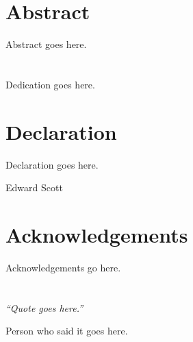 \chapter*{\centering Abstract}
Abstract goes here.


\chapter*{\centering }%
\begin{center}
    \thispagestyle{empty}
    Dedication goes here.
\end{center}


\chapter*{\centering Declaration}
Declaration goes here.


\begin{flushright}
    Edward Scott
\end{flushright}


\chapter*{\centering Acknowledgements}
Acknowledgements go here.


\tableofcontents
\listoffigures
\listoftables


\chapter*{}
\epigraph{\textit{``Quote goes here.''}}{Person who said it goes here.}


\cleardoublepage
